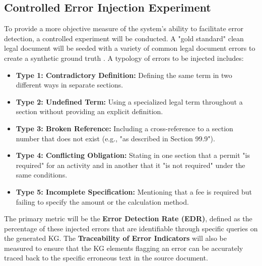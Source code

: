 \subsection{Controlled Error Injection Experiment}
To provide a more objective measure of the system's ability to facilitate error detection, a controlled experiment will be conducted. A "gold standard" clean legal document will be seeded with a variety of common legal document errors to create a synthetic ground truth \parencite{RefWorks:RefID:140-mintz2009distant}. A typology of errors to be injected includes:
\begin{itemize}
    \item \textbf{Type 1: Contradictory Definition:} Defining the same term in two different ways in separate sections.
    \item \textbf{Type 2: Undefined Term:} Using a specialized legal term throughout a section without providing an explicit definition.
    \item \textbf{Type 3: Broken Reference:} Including a cross-reference to a section number that does not exist (e.g., "as described in Section 99.9").
    \item \textbf{Type 4: Conflicting Obligation:} Stating in one section that a permit "is required" for an activity and in another that it "is not required" under the same conditions.
    \item \textbf{Type 5: Incomplete Specification:} Mentioning that a fee is required but failing to specify the amount or the calculation method.
\end{itemize}
The primary metric will be the \textbf{Error Detection Rate (EDR)}, defined as the percentage of these injected errors that are identifiable through specific queries on the generated KG. The \textbf{Traceability of Error Indicators} will also be measured to ensure that the KG elements flagging an error can be accurately traced back to the specific erroneous text in the source document.

